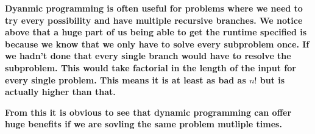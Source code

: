 \documentclass[addpoints]{exam}
\def\mysolution#1{}    %
\begin{document}
\begin{questions}
\begin{parts}
\textbf{Dyanmic programming is often useful for problems where we need to try every possibility and have multiple recursive branches. We notice above that a huge part of us being able to get the runtime specified is because we know that we only have to solve every subproblem once. If we hadn't done that every single branch would have to resolve the subproblem. This would take factorial in the length of the input for every single problem. This means it is at least as bad as $n!$ but is actually higher than that.} 

\textbf{From this it is obvious to see that dynamic programming can offer huge benefits if we are sovling the same problem mutliple times.}

\mysolution{

}
\end{parts}

\end{questions}
\end{document}
